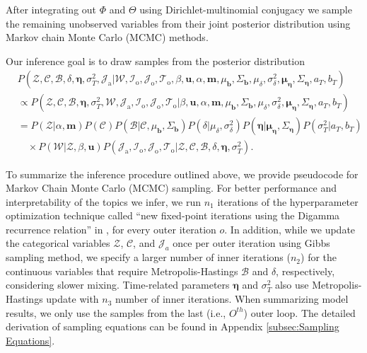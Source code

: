 After integrating out $\Phi$ and $\Theta$ using Dirichlet-multinomial conjugacy \citep{griffiths2004finding} we sample the remaining unobserved variables from their joint posterior distribution using Markov chain Monte Carlo (MCMC) methods.

Our inference goal is to draw samples from the posterior distribution
	  \begin{equation}
	  \begin{aligned}
	  &P(\mathcal{Z}, \mathcal{C}, \mathcal{B}, \delta,  \boldsymbol{\eta}, \sigma_T^2, \mathcal{J}_{\mbox{a}}|\mathcal{W}, \mathcal{I}_{\mbox{o}}, \mathcal{J}_{\mbox{o}}, \mathcal{T}_{\mbox{o}}, \beta, \boldsymbol{u}, \alpha, \boldsymbol{m}, \mu_{\boldsymbol{b}}, \Sigma_{\boldsymbol{b}}, \mu_\delta, \sigma^2_\delta, \boldsymbol{\mu}_{\boldsymbol{\eta}}, \Sigma_{\boldsymbol{\eta}}, a_T, b_T) \\
	  &\propto 	P(\mathcal{Z}, \mathcal{C}, \mathcal{B}, \boldsymbol{\eta}, \sigma_T^2, \mathcal{W}, \mathcal{J}_{\mbox{a}}, \mathcal{I}_{\mbox{o}}, \mathcal{J}_{\mbox{o}}, \mathcal{T}_{\mbox{o}} |\beta, \boldsymbol{u}, \alpha, \boldsymbol{m}, \mu_{\boldsymbol{b}}, \Sigma_{\boldsymbol{b}}, \mu_\delta, \sigma^2_\delta, \boldsymbol{\mu}_{\boldsymbol{\eta}}, \Sigma_{\boldsymbol{\eta}}, a_T, b_T)\\&  = P(\mathcal{Z}|\alpha, \boldsymbol{m})P(\mathcal{C})P(\mathcal{B}|\mathcal{C}, \mu_{\boldsymbol{b}}, \Sigma_{\boldsymbol{b}})P(\delta | \mu_\delta, \sigma^2_\delta)P(\boldsymbol{\eta}| \boldsymbol{\mu}_{\boldsymbol{\eta}}, \Sigma_{\boldsymbol{\eta}})P(\sigma_T^2|a_T, b_T)\\&\quad\times P(\mathcal{W}|\mathcal{Z}, \beta, \boldsymbol{u})P(\mathcal{J}_{\mbox{a}}, \mathcal{I}_{\mbox{o}}, \mathcal{J}_{\mbox{o}}, \mathcal{T}_{\mbox{o}} |\mathcal{Z}, \mathcal{C}, \mathcal{B}, \delta, \boldsymbol{\eta}, \sigma_T^2).
	  \end{aligned}
	  	\label{alg:jointposterior}
	  \end{equation}

 To summarize the inference procedure outlined above, we provide pseudocode for Markov Chain Monte Carlo (MCMC) sampling. For better performance and interpretability of the topics we infer, we run $n_1$ iterations of the hyperparameter optimization technique called ``new fixed-point iterations using the Digamma recurrence relation'' in \cite{wallach2008structured}, for every outer iteration $o$. In addition, while we update the categorical variables $\mathcal{Z}$, $\mathcal{C}$, and $\mathcal{J}_a$ once per outer iteration using Gibbs sampling method, we specify a larger number of inner iterations ($n_2$) for the continuous variables that require Metropolis-Hastings $\mathcal{B}$ and $\delta$, respectively, considering slower mixing. Time-related parameters $\boldsymbol{\eta}$ and $\sigma_T^2$ also use Metropolis-Hastings update with $n_3$ number of inner iterations. When summarizing model results, we only use the samples from the last (i.e., $O^{th}$) outer loop. The detailed derivation of sampling equations can be found in Appendix \ref{subsec:Sampling Equations}. 
 
